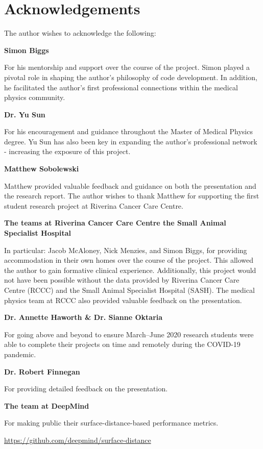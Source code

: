 \chapter{Acknowledgements}
\label{ch:acknowledgements}

The author wishes to acknowledge the following:

\textbf{Simon Biggs}

For his mentorship and support over the course of the project. Simon played a pivotal role
in shaping the author's philosophy of code development. In addition, he facilitated the
author's first professional connections within the medical physics community.

\textbf{Dr. Yu Sun}

For his encouragement and guidance throughout the Master of Medical Physics degree. Yu Sun has also been key in expanding the author's professional network - increasing the exposure of this project.

\textbf{Matthew Sobolewski}

Matthew provided valuable feedback and guidance on both the presentation and the research report. The author wishes to thank Matthew for supporting the first student research project at Riverina Cancer Care Centre.

\textbf{The teams at Riverina Cancer Care Centre the Small Animal Specialist Hospital}

In particular: Jacob McAloney, Nick Menzies, and
Simon Biggs, for providing accommodation in their own homes over the course of
the project. This allowed the author to gain formative clinical experience. Additionally, this project would not have been possible without the data provided by Riverina Cancer Care Centre (RCCC) and the Small Animal Specialist Hospital (SASH). The medical physics team at RCCC also provided valuable feedback on the presentation.


\textbf{Dr. Annette Haworth \& Dr. Sianne Oktaria}

For going above and beyond to ensure March--June 2020 research students were able to complete their projects on time and remotely during the COVID-19 pandemic.

\textbf{Dr. Robert Finnegan}

For providing detailed feedback on the presentation.

\textbf{The team at DeepMind}

For making public their surface-distance-based performance metrics.

\url{https://github.com/deepmind/surface-distance}
